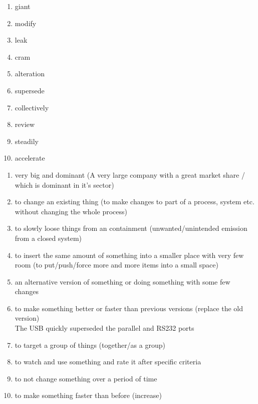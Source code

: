 \begin{multicols}{2}
\begin{enumerate}
\item giant
\item modify
\item leak
\item cram
\item alteration
\item supersede
\item collectively
\item review
\item steadily
\item accelerate
\end{enumerate}
\end{multicols}
\begin{enumerate}
\item very big and dominant (A very large company with a great market share / which is dominant in it's sector)
\item to change an existing thing (to make changes to part of a process, system \ac{etc.} without changing the whole process)
\item to slowly loose things from an containment (unwanted/unintended emission from a closed system)
\item to insert the same amount of something into a smaller place with very few room (to put/push/force more and more items into a small space)
\item an alternative version of something or doing something with some few changes
\item to make something better or faster than previous versions (replace the old version)\\
		\Ra The USB quickly superseded the parallel and RS232 ports
\item to target a group of things (together/as a group)
\item to watch and use something and rate it after specific criteria
\item to not change something over a period of time
\item to make something faster than before (increase)
\end{enumerate}

